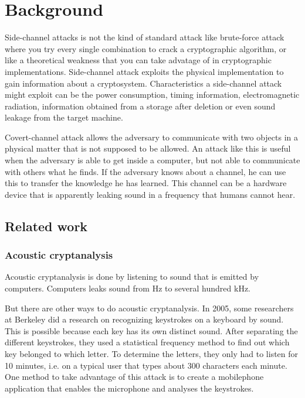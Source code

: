 \chapter{Background}
\label{chp:background} 

Side-channel attacks is not the kind of standard attack like brute-force attack where you try every single combination to crack a cryptographic algorithm, or like a theoretical weakness that you can take advatage of in cryptographic implementations. 
Side-channel attack exploits the physical implementation to gain information about a cryptosystem.
Characteristics a side-channel attack might exploit can be the power consumption, timing information, electromagnetic radiation, information obtained from a storage after deletion or even sound leakage from the target machine.

Covert-channel attack allows the adversary to communicate with two objects in a physical matter that is not supposed to be allowed. An attack like this is useful when the adversary is able to get inside a computer, but not able to communicate with others what he finds. 
If the adversary knows about a channel, he can use this to transfer the knowledge he has learned.
This channel can be a hardware device that is apparently leaking sound in a frequency that humans cannot hear.


\section{Related work}\label{sec:related_work}

\subsection{Acoustic cryptanalysis}\label{sec:acoustic_cryptanalysis}

Acoustic cryptanalysis is done by listening to sound that is emitted by computers. 
Computers leaks sound from Hz to several hundred kHz. 

But there are other ways to do acoustic cryptanalysis. In 2005, some researchers at Berkeley did a research\cite{keystrokes} on recognizing keystrokes on a keyboard by sound. 
This is possible because each key has its own distinct sound. 
After separating the different keystrokes, they used a statistical frequency method to find out which key belonged to which letter. 
To determine the letters, they only had to listen for 10 minutes, i.e. on a typical user that types about 300 characters each minute. 
One method to take advantage of this attack is to create a mobilephone application that enables the microphone and analyses the keystrokes. 

